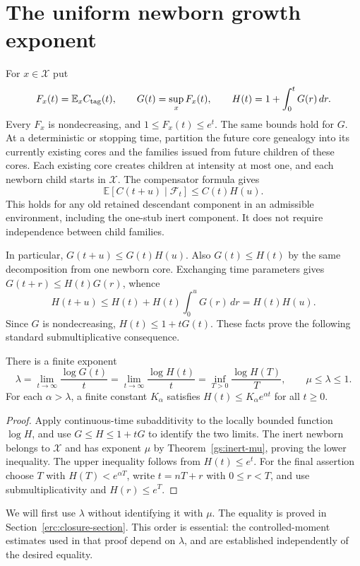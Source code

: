 \section{The uniform newborn growth exponent}
\label{uniform:section}

For $x\in\mathcal X$ put
\[
 F_x(t)=\mathbb E_xC_{\rm tag}(t),\qquad
 G(t)=\sup_xF_x(t),\qquad H(t)=1+\int_0^tG(r)\,dr.
\]
Every $F_x$ is nondecreasing, and $1\le F_x(t)\le e^t$. The same
bounds hold for $G$. At a deterministic or stopping time, partition
the future core genealogy into its currently existing cores and the
families issued from future children of these cores. Each existing
core creates children at intensity at most one, and each newborn
child starts in $\mathcal X$. The compensator formula gives
\begin{equation}\label{uniform:old-core}
 \mathbb E[C(t+u)\mid\mathcal F_t]\le C(t)H(u).
\end{equation}
This holds for any old retained descendant component in an admissible
environment, including the one-stub inert component. It does not
require independence between child families.

In particular, $G(t+u)\le G(t)H(u)$. Also $G(t)\le H(t)$ by the same
decomposition from one newborn core. Exchanging time parameters gives
$G(t+r)\le H(t)G(r)$, whence
\[
 H(t+u)\le H(t)+H(t)\int_0^uG(r)\,dr=H(t)H(u).
\]
Since $G$ is nondecreasing, $H(t)\le1+tG(t)$. These facts prove the
following standard submultiplicative consequence.

\begin{proposition}\label{uniform:lambda}
There is a finite exponent
\begin{equation}\label{uniform:lambda-equation}
 \lambda=\lim_{t\to\infty}\frac{\log G(t)}t
 =\lim_{t\to\infty}\frac{\log H(t)}t
 =\inf_{T>0}\frac{\log H(T)}T,
 \qquad \mu\le\lambda\le1.
\end{equation}
For each $\alpha>\lambda$, a finite constant $K_\alpha$ satisfies
$H(t)\le K_\alpha e^{\alpha t}$ for all $t\ge0$.
\end{proposition}
\begin{proof}
Apply continuous-time subadditivity to the locally bounded function
$\log H$, and use $G\le H\le1+tG$ to identify the two limits. The
inert newborn belongs to $\mathcal X$ and has exponent $\mu$ by
Theorem~\ref{gs:inert-mu}, proving the lower inequality. The upper
inequality follows from $H(t)\le e^t$. For the final assertion choose
$T$ with $H(T)<e^{\alpha T}$, write $t=nT+r$ with $0\le r<T$, and
use submultiplicativity and $H(r)\le e^T$.
\end{proof}

We will first use $\lambda$ without identifying it with $\mu$.
The equality is proved in Section~\ref{erc:closure-section}. This
order is essential: the controlled-moment estimates used in that
proof depend on $\lambda$, and are established independently of the
desired equality.

